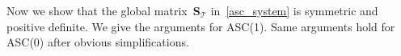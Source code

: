 \documentclass[12pt]{article}
\newcommand{\vect}[1]{\boldsymbol{\mathbf{#1}}}
\newcommand{\bcell}{T}
\newcommand{\bmesh}{{\vect{\mathcal T}}}
\newcommand{\mmesh}{{\vect{\mathcal \tau}}}
\DeclareMathOperator{\Ker}{Ker}
\newtheorem{theorem}{Theorem}[section]
\begin{document}
	
	Now we show that the global matrix~$\vect S_\bmesh$ in~\eqref{asc_system} is symmetric and positive definite. We give the arguments for ASC(1). Same arguments hold for  ASC(0) after obvious simplifications.
%		
\end{document}
